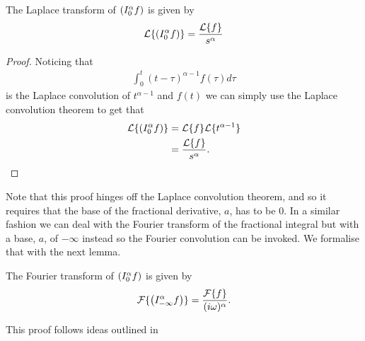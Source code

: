 \begin{mdframed}[innertopmargin=10pt]
\begin{lemma}
    \label{lem:rli_laplace}
    The Laplace transform of $ \left( I_{0}^{\alpha} f \right) $ is given by
    \begin{align*}
        \mathcal{L}\{ \left( I_{0}^{\alpha} f \right) \} = \frac{\mathcal{L}\{f\}}{s^\alpha}
    \end{align*}
\end{lemma}
\end{mdframed}
\begin{proof}
    Noticing that 
    \begin{align*}
        \int_0^t (t - \tau)^{\alpha - 1} f(\tau) d\tau 
    \end{align*}
    is the Laplace convolution of $ t^{\alpha - 1} $ and $ f(t) $ we can simply use the Laplace convolution theorem
    to get that
    \begin{align*}
        \mathcal{L}\{ \left( I_{0}^{\alpha} f \right) \} &= \mathcal{L}\{f\} \mathcal{L}\{ t^{\alpha - 1} \} \\
            &= \frac{\mathcal{L}\{f\}}{s^\alpha}.
    \end{align*}
\end{proof}
Note that this proof hinges off the Laplace convolution theorem, and so it requires that the base of the fractional derivative, $ a $, has to be $ 0 $. In a similar fashion we can deal with the Fourier transform of the fractional integral but with a base, $ a $, of $ -\infty $ instead so the Fourier convolution can be invoked. We formalise that with the next lemma.
\begin{mdframed}[innertopmargin=10pt]
\begin{lemma}
    \label{lem:rli_fourier}
    The Fourier transform of $ \left( I_{0}^{\alpha} f \right) $ is given by
    \begin{align*}
        \mathcal{F}\{ \left( I_{-\infty}^{\alpha} f \right) \} = \frac{\mathcal{F}\{f\}}{(i\omega)^\alpha}.
    \end{align*}
\end{lemma}
\end{mdframed}
This proof follows ideas outlined in \cite{Podlubny1999}
